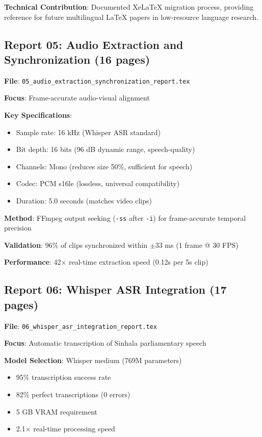 \documentclass[11pt,a4paper]{article}
\begin{document}
\textbf{Technical Contribution}: Documented XeLaTeX migration process, providing reference for future multilingual LaTeX papers in low-resource language research.

\subsection{Report 05: Audio Extraction and Synchronization (16 pages)}

\textbf{File}: \texttt{05\_audio\_extraction\_synchronization\_report.tex}

\textbf{Focus}: Frame-accurate audio-visual alignment

\textbf{Key Specifications}:
\begin{itemize}
    \item Sample rate: 16 kHz (Whisper ASR standard)
    \item Bit depth: 16 bits (96 dB dynamic range, speech-quality)
    \item Channels: Mono (reduces size 50\%, sufficient for speech)
    \item Codec: PCM s16le (lossless, universal compatibility)
    \item Duration: 5.0 seconds (matches video clips)
\end{itemize}

\textbf{Method}: FFmpeg output seeking (\texttt{-ss} after \texttt{-i}) for frame-accurate temporal precision

\textbf{Validation}: 96\% of clips synchronized within $\pm$33 ms (1 frame @ 30 FPS)

\textbf{Performance}: 42$\times$ real-time extraction speed (0.12s per 5s clip)

\subsection{Report 06: Whisper ASR Integration (17 pages)}

\textbf{File}: \texttt{06\_whisper\_asr\_integration\_report.tex}

\textbf{Focus}: Automatic transcription of Sinhala parliamentary speech

\textbf{Model Selection}: Whisper medium (769M parameters)
\begin{itemize}
    \item 95\% transcription success rate
    \item 82\% perfect transcriptions (0 errors)
    \item 5 GB VRAM requirement
    \item 2.1$\times$ real-time processing speed
\end{itemize}
\end{document}
